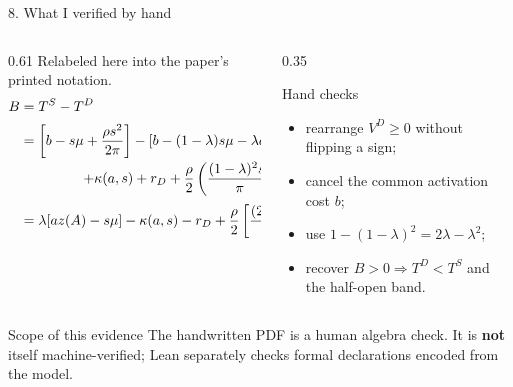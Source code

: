 \documentclass[aspectratio=169,10pt]{beamer}
\newcommand{\source}[1]{\textcolor{Slate}{\scriptsize #1}}
\begin{document}
\begin{frame}{8. What I verified by hand}
  \begin{columns}[T,onlytextwidth]
    \begin{column}{0.61\textwidth}
      \source{Relabeled here into the paper's printed notation.}
      \vspace{-0.10cm}
      {\footnotesize\begin{align*}
        B
        &=T^S-T^D\\[0.06cm]
        &=\left[b-s\mu+\frac{\rho s^2}{2\pi}\right]
        -\left[
          b-(1-\lambda)s\mu-\lambda az(A)\right.\\[-0.05cm]
        &\hspace{1.5cm}\left.
          +\kappa(a,s)+r_D
          +\frac{\rho}{2}
          \left(\frac{(1-\lambda)^2s^2}{\pi}+\sigma_D^2\right)
        \right]\\[0.06cm]
        &=\lambda[az(A)-s\mu]-\kappa(a,s)-r_D
          +\frac{\rho}{2}
          \left[
            \frac{(2\lambda-\lambda^2)s^2}{\pi}-\sigma_D^2
          \right].
      \end{align*}}
    \end{column}
    \begin{column}{0.35\textwidth}
      \begin{exampleblock}{Hand checks}
        \small
        \begin{itemize}
          \item rearrange $V^D\ge0$ without flipping a sign;
          \item cancel the common activation cost $b$;
          \item use $1-(1-\lambda)^2=2\lambda-\lambda^2$;
          \item recover $B>0\Rightarrow T^D<T^S$ and the half-open band.
        \end{itemize}
      \end{exampleblock}
    \end{column}
  \end{columns}

  \vspace{0.06cm}
  \begin{alertblock}{Scope of this evidence}
    \small The handwritten PDF is a human algebra check. It is \textbf{not} itself machine-verified; Lean separately checks formal declarations encoded from the model.
  \end{alertblock}
\end{frame}
\end{document}
